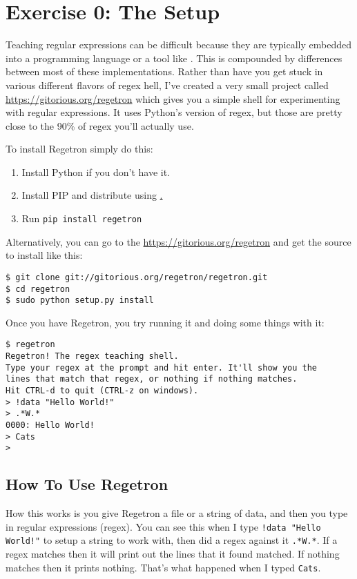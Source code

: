 \chapter{Exercise 0: The Setup}

Teaching regular expressions can be difficult because they are typically embedded into 
a programming language or a tool like .  This is compounded by differences
between most of these implementations.  Rather than have you get stuck in various 
different flavors of regex hell, I've created a very small project called 
\href{Regetron}{https://gitorious.org/regetron} which gives you a simple shell
for experimenting with regular expressions.  It uses Python's version of regex, but
those are pretty close to the 90\% of regex you'll actually use.

To install Regetron simply do this:

\begin{enumerate}
\item Install Python if you don't have it.
\item Install PIP and distribute using \href{http://pypi.python.org/pypi/distribute}.
\item Run \verb|pip install regetron|
\end{enumerate}

Alternatively, you can go to the \href{Regetron project page}{https://gitorious.org/regetron}
and get the source to install like this:

\begin{lstlisting}
$ git clone git://gitorious.org/regetron/regetron.git
$ cd regetron
$ sudo python setup.py install
\end{lstlisting}

Once you have Regetron, you try running it and doing some things with it:

\begin{lstlisting}
$ regetron
Regetron! The regex teaching shell.
Type your regex at the prompt and hit enter. It'll show you the
lines that match that regex, or nothing if nothing matches.
Hit CTRL-d to quit (CTRL-z on windows).
> !data "Hello World!"
> .*W.*
0000: Hello World!
> Cats
> 
\end{lstlisting}


\section{How To Use Regetron}

How this works is you give Regetron a file or a string of data, and then you
type in regular expressions (regex).  You can see this when I type \verb|!data "Hello World!"|
to setup a string to work with, then did a regex against it
\verb|.*W.*|.  If a regex matches then it will print out the lines that it
found matched.  If nothing matches then it prints nothing.  That's what 
happened when I typed \verb|Cats|.

